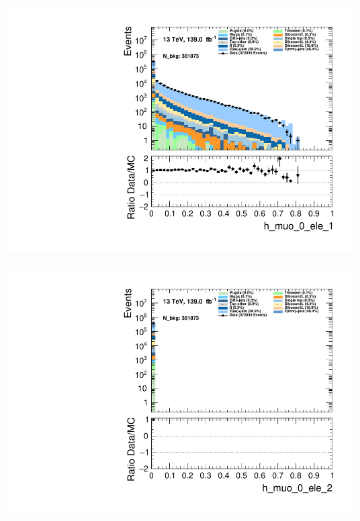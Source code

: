 \begin{figure}
\begin{subfigure}{.49\textwidth}
        \includegraphics[width=\textwidth]{Figures/MC_Data_comp/h_muo_0_ele_1.pdf}
        \caption{ }
        \label{fig:fep}
    \end{subfigure}
    \hfill
    \begin{subfigure}{.49\textwidth}
        \includegraphics[width=\textwidth]{Figures/MC_Data_comp/h_muo_0_ele_2.pdf}
        \caption{ }
        \label{fig:fe}
    \end{subfigure}
    \hfill       
    \caption{}
    \label{fig:t}
\end{figure}


